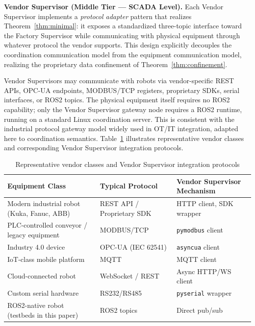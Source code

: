 \documentclass[a4paper,fleqn]{cas-dc}
\begin{document}
\textbf{Vendor Supervisor (Middle Tier — SCADA Level).} Each Vendor Supervisor implements a \emph{protocol adapter} pattern that realizes Theorem~\ref{thm:minimal}: it exposes a standardized three-topic interface toward the Factory Supervisor while communicating with physical equipment through whatever protocol the vendor supports. This design explicitly decouples the coordination communication model from the equipment communication model, realizing the proprietary data confinement of Theorem~\ref{thm:confinement}.

Vendor Supervisors may communicate with robots via vendor-specific REST APIs, OPC-UA endpoints, MODBUS/TCP registers, proprietary SDKs, serial interfaces, or ROS2 topics. The physical equipment itself requires no ROS2 capability; only the Vendor Supervisor gateway node requires a ROS2 runtime, running on a standard Linux coordination server. This is consistent with the industrial protocol gateway model widely used in OT/IT integration, adapted here to coordination semantics. Table~\ref{tab:protocols} illustrates representative vendor classes and corresponding Vendor Supervisor integration protocols. 

\begin{table}[h]
\centering
\caption{Representative vendor classes and Vendor Supervisor integration protocols}
\label{tab:protocols}
\begin{tabular}{lll}
\toprule
\textbf{Equipment Class} & \textbf{Typical Protocol} & \textbf{Vendor Supervisor Mechanism} \\
\midrule
Modern industrial robot (Kuka, Fanuc, ABB) & REST API / Proprietary SDK & HTTP client, SDK wrapper \\
PLC-controlled conveyor / legacy equipment & MODBUS/TCP & \texttt{pymodbus} client \\
Industry 4.0 device & OPC-UA (IEC 62541) & \texttt{asyncua} client \\
IoT-class mobile platform & MQTT & MQTT client \\
Cloud-connected robot & WebSocket / REST & Async HTTP/WS client \\
Custom serial hardware & RS232/RS485 & \texttt{pyserial} wrapper \\
ROS2-native robot (testbeds in this paper) & ROS2 topics & Direct pub/sub \\
\bottomrule
\end{tabular}
\end{table}
\end{document}
